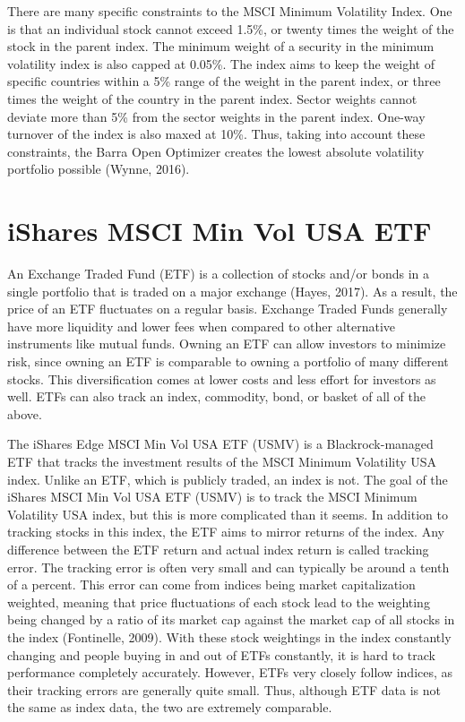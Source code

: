\documentclass[12pt,twoside]{reedthesis}
\theoremstyle{definition}
\theoremstyle{definition}
\theoremstyle{definition}
\theoremstyle{remark}
\begin{document}
There are many specific constraints to the MSCI Minimum Volatility
Index. One is that an individual stock cannot exceed 1.5\%, or twenty
times the weight of the stock in the parent index. The minimum weight of
a security in the minimum volatility index is also capped at 0.05\%. The
index aims to keep the weight of specific countries within a 5\% range
of the weight in the parent index, or three times the weight of the
country in the parent index. Sector weights cannot deviate more than 5\%
from the sector weights in the parent index. One-way turnover of the
index is also maxed at 10\%. Thus, taking into account these
constraints, the Barra Open Optimizer creates the lowest absolute
volatility portfolio possible (Wynne, 2016).

\section{iShares MSCI Min Vol USA
ETF}\label{ishares-msci-min-vol-usa-etf}

An Exchange Traded Fund (ETF) is a collection of stocks and/or bonds in
a single portfolio that is traded on a major exchange (Hayes, 2017). As
a result, the price of an ETF fluctuates on a regular basis. Exchange
Traded Funds generally have more liquidity and lower fees when compared
to other alternative instruments like mutual funds. Owning an ETF can
allow investors to minimize risk, since owning an ETF is comparable to
owning a portfolio of many different stocks. This diversification comes
at lower costs and less effort for investors as well. ETFs can also
track an index, commodity, bond, or basket of all of the above.

The iShares Edge MSCI Min Vol USA ETF (USMV) is a Blackrock-managed ETF
that tracks the investment results of the MSCI Minimum Volatility USA
index. Unlike an ETF, which is publicly traded, an index is not. The
goal of the iShares MSCI Min Vol USA ETF (USMV) is to track the MSCI
Minimum Volatility USA index, but this is more complicated than it
seems. In addition to tracking stocks in this index, the ETF aims to
mirror returns of the index. Any difference between the ETF return and
actual index return is called tracking error. The tracking error is
often very small and can typically be around a tenth of a percent. This
error can come from indices being market capitalization weighted,
meaning that price fluctuations of each stock lead to the weighting
being changed by a ratio of its market cap against the market cap of all
stocks in the index (Fontinelle, 2009). With these stock weightings in
the index constantly changing and people buying in and out of ETFs
constantly, it is hard to track performance completely accurately.
However, ETFs very closely follow indices, as their tracking errors are
generally quite small. Thus, although ETF data is not the same as index
data, the two are extremely comparable.
\end{document}
